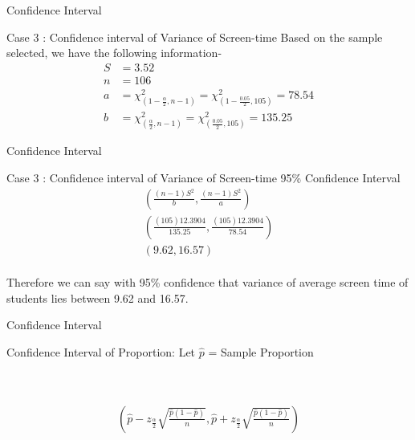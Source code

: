 \documentclass{beamer}
\begin{document}
\begin{frame}{Confidence Interval}
\begin{block}{Case 3 : Confidence interval of Variance of Screen-time}
Based on the sample selected, we have the following information-
\begin{align}
    S &= 3.52\\
    n &= 106\\
    a &= \chi^2_{(1-\frac{\alpha}{2},n-1)}= \chi^2_{(1-\frac{0.05}{2},105)}  = 78.54\\
    b &= \chi^2_{(\frac{\alpha}{2},n-1)} = \chi^2_{(\frac{0.05}{2},105)} = 135.25 
\end{align}
\end{block}
\end{frame}
\begin{frame}{Confidence Interval}
\begin{block}{Case 3 : Confidence interval of Variance of Screen-time}
95\% Confidence Interval
 \begin{gather}
      (\frac{(n-1)S^2}{b},\frac{(n-1)S^2}{a})\\
      (\frac{(105)12.3904}{135.25},\frac{(105)12.3904}{78.54})\\
      (9.62,16.57)
 \end{gather}
\\Therefore we can say with 95\% confidence that variance of average screen time of students lies between 9.62 and 16.57.
\end{block}
\end{frame}

\begin{frame}{Confidence Interval}
\begin{block}{Confidence Interval of Proportion:}
Let $\hat{p}$ = Sample Proportion
\\
\\
        \\ 
        
      \begin{align}
      \left(\hat{p}-z_{\frac{\alpha}{2}}\sqrt{\frac{\hat{p}(1-\hat{p})}{n}},\hat{p}+z_{\frac{\alpha}{2}}\sqrt{\frac{\hat{p}(1-\hat{p})}{n}}\right)
 \end{align}

\end{block}
\end{frame}
\end{document}
